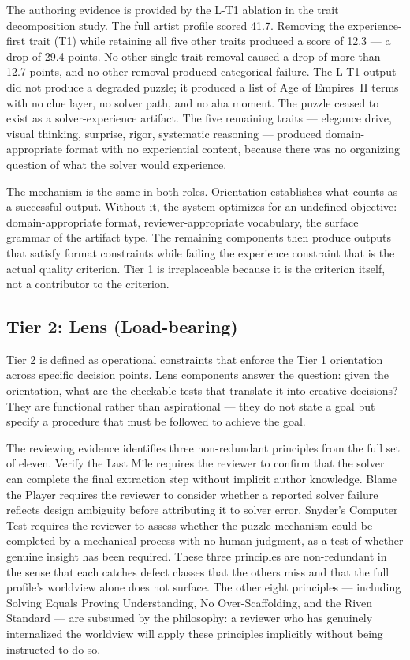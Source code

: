 The authoring evidence is provided by the L-T1 ablation in the trait decomposition
study. The full artist profile scored 41.7. Removing the experience-first trait (T1)
while retaining all five other traits produced a score of 12.3 --- a drop of 29.4
points. No other single-trait removal caused a drop of more than 12.7 points, and
no other removal produced categorical failure. The L-T1 output did not produce a
degraded puzzle; it produced a list of Age of Empires~II terms with no clue layer,
no solver path, and no aha moment. The puzzle ceased to exist as a
solver-experience artifact. The five remaining traits --- elegance drive, visual
thinking, surprise, rigor, systematic reasoning --- produced domain-appropriate format
with no experiential content, because there was no organizing question of what the
solver would experience.

The mechanism is the same in both roles. Orientation establishes what counts as a
successful output. Without it, the system optimizes for an undefined objective:
domain-appropriate format, reviewer-appropriate vocabulary, the surface grammar of
the artifact type. The remaining components then produce outputs that satisfy format
constraints while failing the experience constraint that is the actual quality
criterion. Tier 1 is irreplaceable because it is the criterion itself, not a
contributor to the criterion.

\subsection{Tier 2: Lens (Load-bearing)}

Tier 2 is defined as operational constraints that enforce the Tier 1 orientation
across specific decision points. Lens components answer the question: given the
orientation, what are the checkable tests that translate it into creative decisions?
They are functional rather than aspirational --- they do not state a goal but specify
a procedure that must be followed to achieve the goal.

The reviewing evidence identifies three non-redundant principles from the full set of
eleven. Verify the Last Mile requires the reviewer to confirm that the solver can
complete the final extraction step without implicit author knowledge. Blame the Player
requires the reviewer to consider whether a reported solver failure reflects design
ambiguity before attributing it to solver error. Snyder's Computer Test requires the
reviewer to assess whether the puzzle mechanism could be completed by a mechanical
process with no human judgment, as a test of whether genuine insight has been
required. These three principles are non-redundant in the sense that each catches
defect classes that the others miss and that the full profile's worldview alone does
not surface. The other eight principles --- including Solving Equals Proving
Understanding, No Over-Scaffolding, and the Riven Standard --- are subsumed by the
philosophy: a reviewer who has genuinely internalized the worldview will apply these
principles implicitly without being instructed to do so.


